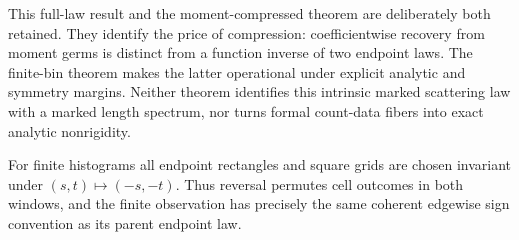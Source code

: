 This full-law result and the moment-compressed theorem are deliberately
both retained. They identify the price of compression: coefficientwise
recovery from moment germs is distinct from a function inverse of two
endpoint laws. The finite-bin theorem makes the latter operational
under explicit analytic and symmetry margins. Neither theorem identifies
this intrinsic marked scattering law with a marked length spectrum, nor
turns formal count-data fibers into exact analytic nonrigidity.

For finite histograms all endpoint rectangles and square grids are chosen
invariant under $(s,t)\mapsto(-s,-t)$. Thus reversal permutes cell
outcomes in both windows, and the finite observation has precisely the
same coherent edgewise sign convention as its parent endpoint law.
